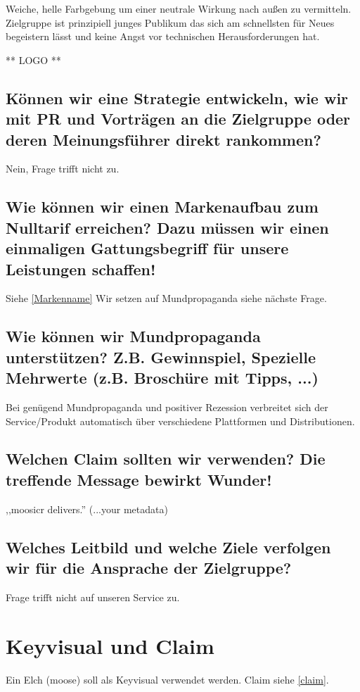 \documentclass[11pt]{scrreprt}
\begin{document}
Weiche, helle Farbgebung um einer neutrale Wirkung nach außen zu vermitteln.
Zielgruppe ist prinzipiell junges Publikum das sich am schnellsten für Neues
begeistern lässt und keine Angst vor technischen Herausforderungen hat.

** LOGO **

\section{Können wir eine Strategie entwickeln, wie wir
mit PR und Vorträgen an die Zielgruppe oder
deren Meinungsführer direkt rankommen?}

Nein, Frage trifft nicht zu.

\section{Wie können wir einen Markenaufbau zum Nulltarif
erreichen?
Dazu müssen wir einen einmaligen Gattungsbegriff
für unsere Leistungen schaffen!}

Siehe \ref{Markenname} 
Wir setzen auf Mundpropaganda siehe nächste Frage.

\section{Wie können wir Mundpropaganda
unterstützen?
Z.B. Gewinnspiel, Spezielle Mehrwerte (z.B.
Broschüre mit Tipps, ...)}
Bei genügend Mundpropaganda und positiver Rezession verbreitet sich der
Service/Produkt automatisch über verschiedene Plattformen und Distributionen.

\label{claim}\section{Welchen Claim sollten wir verwenden?
Die treffende Message bewirkt Wunder!}

,,moosicr delivers.'' (...your metadata)

\section{Welches Leitbild und welche Ziele verfolgen wir
für die Ansprache der Zielgruppe?}

Frage trifft nicht auf unseren Service zu.

\chapter{Keyvisual und Claim}
Ein Elch (moose) soll als Keyvisual verwendet werden. Claim siehe \ref{claim}.
\end{document}
